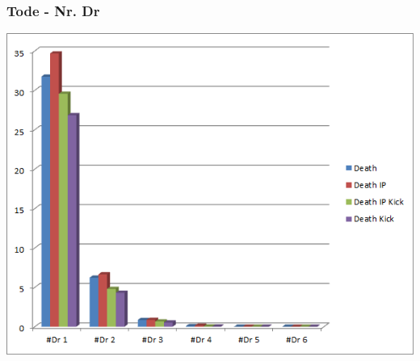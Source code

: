 \documentclass{beamer}
\begin{document}
\begin{frame}
	\frametitle{Tode - Nr. Dr}
	\begin{center}
		\includegraphics[scale=0.65]{img/DeathsNrDr.png}
	\end{center}
\end{frame}

\end{document}
